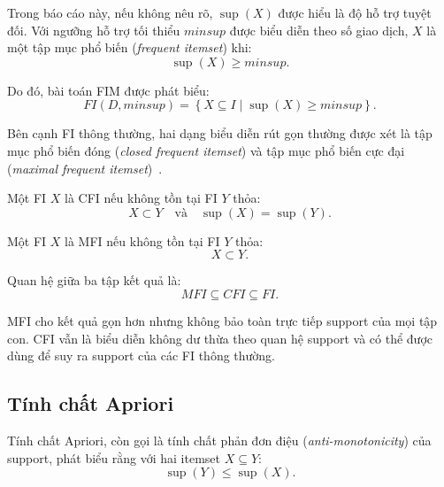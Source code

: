 Trong báo cáo này, nếu không nêu rõ, $\operatorname{sup}(X)$ được hiểu là độ
hỗ trợ tuyệt đối. Với ngưỡng hỗ trợ tối thiểu $\mathit{minsup}$ được biểu diễn
theo số giao dịch, $X$ là một tập mục phổ biến (\textit{frequent itemset})
khi:
\begin{equation}
    \operatorname{sup}(X) \geq \mathit{minsup}.
    \label{eq:frequent-itemset-condition}
\end{equation}

Do đó, bài toán FIM được phát biểu:
\begin{equation}
    FI(D,\mathit{minsup})
    =
    \left\{
        X \subseteq I
        \mid
        \operatorname{sup}(X) \geq \mathit{minsup}
    \right\}.
    \label{eq:fim-problem}
\end{equation}

Bên cạnh FI thông thường, hai dạng biểu diễn rút gọn thường được xét là tập mục
phổ biến đóng (\textit{closed frequent itemset}) và tập mục phổ biến cực
đại (\textit{maximal frequent itemset})~\cite{han2011datamining}.

Một FI $X$ là CFI nếu không tồn tại FI $Y$ thỏa:
\begin{equation}
    X \subset Y
    \quad\text{và}\quad
    \operatorname{sup}(X)=\operatorname{sup}(Y).
    \label{eq:closed-frequent-itemset}
\end{equation}

Một FI $X$ là MFI nếu không tồn tại FI $Y$ thỏa:
\begin{equation}
    X \subset Y.
    \label{eq:maximal-frequent-itemset}
\end{equation}

Quan hệ giữa ba tập kết quả là:
\begin{equation}
    MFI \subseteq CFI \subseteq FI.
    \label{eq:fi-cfi-mfi-relation}
\end{equation}

MFI cho kết quả gọn hơn nhưng không bảo toàn trực tiếp support của mọi tập con.
CFI vẫn là biểu diễn không dư thừa theo quan hệ support và có thể được dùng để
suy ra support của các FI thông thường.

\subsection{Tính chất Apriori}

Tính chất Apriori, còn gọi là tính chất phản đơn điệu
(\textit{anti-monotonicity}) của support, phát biểu rằng với hai itemset
$X \subseteq Y$:
\begin{equation}
    \operatorname{sup}(Y) \leq \operatorname{sup}(X).
    \label{eq:apriori-property}
\end{equation}

